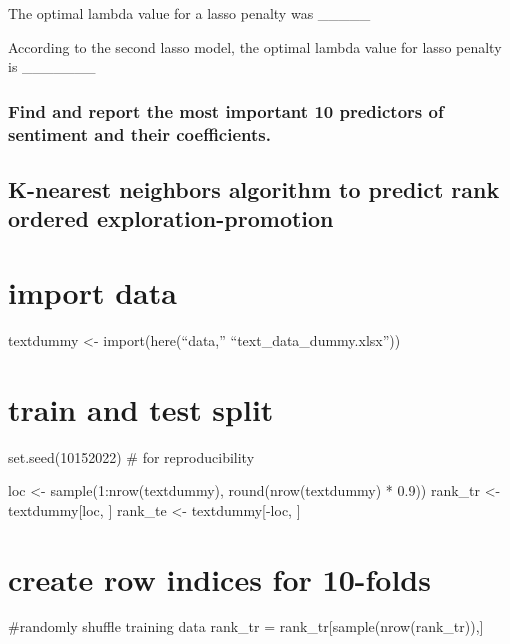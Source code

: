\documentclass[
  english,
  man]{apa6}
\begin{document}
The optimal lambda value for a lasso penalty was \_\_\_\_\_

According to the second lasso model, the optimal lambda value for lasso penalty is \_\_\_\_\_\_\_

\hypertarget{find-and-report-the-most-important-10-predictors-of-sentiment-and-their-coefficients.}{%
\subsubsection{Find and report the most important 10 predictors of sentiment and their coefficients.}\label{find-and-report-the-most-important-10-predictors-of-sentiment-and-their-coefficients.}}

\hypertarget{k-nearest-neighbors-algorithm-to-predict-rank-ordered-exploration-promotion}{%
\subsection{K-nearest neighbors algorithm to predict rank ordered exploration-promotion}\label{k-nearest-neighbors-algorithm-to-predict-rank-ordered-exploration-promotion}}

\hypertarget{import-data}{%
\section{import data}\label{import-data}}

textdummy \textless- import(here(``data,'' ``text\_data\_dummy.xlsx''))

\hypertarget{train-and-test-split}{%
\section{train and test split}\label{train-and-test-split}}

set.seed(10152022) \# for reproducibility

loc \textless- sample(1:nrow(textdummy), round(nrow(textdummy) * 0.9))
rank\_tr \textless- textdummy{[}loc, {]}
rank\_te \textless- textdummy{[}-loc, {]}

\hypertarget{create-row-indices-for-10-folds}{%
\section{create row indices for 10-folds}\label{create-row-indices-for-10-folds}}

\#randomly shuffle training data
rank\_tr = rank\_tr{[}sample(nrow(rank\_tr)),{]}
\end{document}
